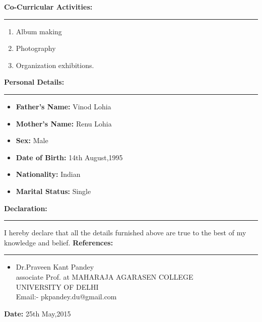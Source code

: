 \documentclass[a4paper,10pt]{article}
\begin{document}
\begin{flushleft}
  \textbf{\large Co-Curricular Activities:}\\
  \hrule
  \begin{enumerate}
  	\item Album making\\
  	\item Photography\\
  	\item Organization exhibitions.\\
  \end{enumerate}
  \textbf{\large Personal Details:}\\
   \hrule
    \begin{itemize}
    	\item  \textbf{Father's Name:} Vinod Lohia\\
    	\item  \textbf{Mother's Name:} Renu Lohia\\
    	\item  \textbf{Sex:} Male\\
    	\item  \textbf{Date of Birth:} 14th August,1995\\
    	\item  \textbf{Nationality:}   Indian\\
    	\item  \textbf{Marital Status:}  Single\\
    \end{itemize}
     \textbf{ \large Declaration: }\\
      \hrule
      \bigskip 
     I hereby declare that all the details furnished above are true to the best of my knowledge and belief.
     \medskip
      \textbf{ \large References: }\\
    \hrule
    \begin{itemize}
    	\item 
    	     Dr.Praveen Kant Pandey\\
    	     associate Prof. at MAHARAJA AGARASEN COLLEGE\\
    	     UNIVERSITY OF DELHI \\
    	     Email:- pkpandey.du@gmail.com
     \end{itemize}
     \textbf{ Date: }25th May,2015\\
\end{flushleft}
\end{document}
